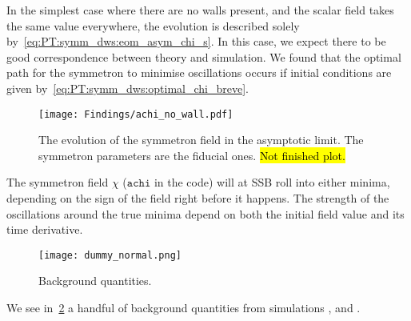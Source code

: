 

\newcommand{\brphi}{\breve{\phi}}
\newcommand{\brchi}{\breve{\chi}}




In the simplest case where there are no walls present, and the scalar field takes the same value everywhere, the evolution is described solely by~\cref{eq:PT:symm_dws:eom_asym_chi_s}. In this case, we expect there to be good correspondence between theory and simulation. We found that the optimal path for the symmetron to minimise oscillations occurs if initial conditions are given by~\cref{eq:PT:symm_dws:optimal_chi_breve}.
\begin{figure}[h]\label{fig:results:achi:achi_no_wall}
    \centering
    \texttt{[image: Findings/achi\_no\_wall.pdf]}
    \caption{The evolution of the symmetron field in the asymptotic limit. The symmetron parameters are the fiducial ones. \hl{Not finished plot.}}
\end{figure}



The symmetron field $\chi$ ($\mathtt{achi}$ in the code) will at SSB roll into either minima, depending on the sign of the field right before it happens. The strength of the oscillations around the true minima depend on both the initial field value and its time derivative. 



\begin{figure}[h]\label{fig:results:achi:dummy}
    \centering
    \texttt{[image: dummy\_normal.png]}
    \caption{Background quantities.}
\end{figure}
We see in~\cref{fig:results:achi:dummy} a handful of background quantities from simulations ,  and . 






